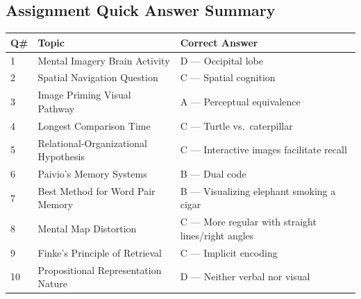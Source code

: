 \documentclass[11pt,a4paper]{article}
\newcommand{\bb}[1]{\textbf{#1}}
\begin{document}
\medskip
\subsection*{Assignment Quick Answer Summary}

\begin{center}
\renewcommand{\arraystretch}{1.4}
\begin{tabular}{|L{0.8cm}|L{5.5cm}|L{8.9cm}|}
\hline
\bb{Q\#} & \bb{Topic} & \bb{Correct Answer} \\
 & Mental Imagery Brain Activity & D — Occipital lobe \\
2 & Spatial Navigation Question & C — Spatial cognition \\
3 & Image Priming Visual Pathway & A — Perceptual equivalence \\
4 & Longest Comparison Time & C — Turtle vs.\ caterpillar \\
5 & Relational-Organizational Hypothesis & C — Interactive images facilitate recall \\
6 & Paivio's Memory Systems & B — Dual code \\
7 & Best Method for Word Pair Memory & B — Visualizing elephant smoking a cigar \\
8 & Mental Map Distortion & C — More regular with straight lines/right angles \\
9 & Finke's Principle of Retrieval & C — Implicit encoding \\
10 & Propositional Representation Nature & D — Neither verbal nor visual \\
\hline
\end{tabular}
\end{center}

\medskip
\end{document}
